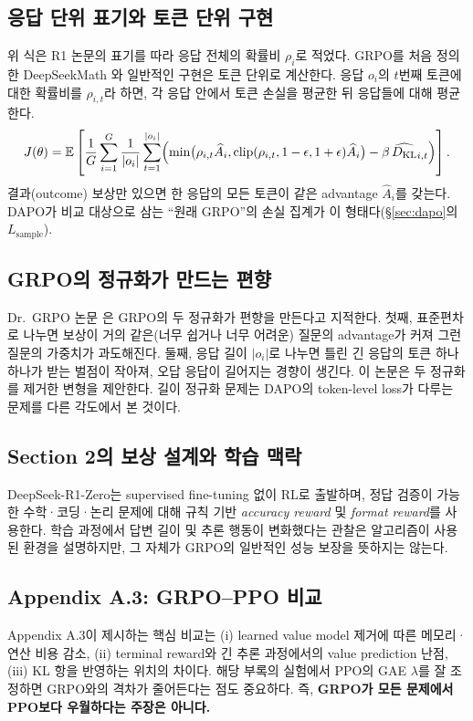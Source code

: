 \documentclass[11pt,a4paper]{article}
\newcommand{\E}{\mathbb{E}}
\newcommand{\KL}{D_{\mathrm{KL}}}
\newcommand{\clip}{\operatorname{clip}}
\begin{document}
\subsection{응답 단위 표기와 토큰 단위 구현}
위 식은 R1 논문의 표기를 따라 응답 전체의 확률비 \(\rho_i\)로 적었다. GRPO를 처음 정의한 DeepSeekMath \cite{deepseekmath}와 일반적인 구현은 토큰 단위로 계산한다. 응답 \(o_i\)의 \(t\)번째 토큰에 대한 확률비를 \(\rho_{i,t}\)라 하면, 각 응답 안에서 토큰 손실을 평균한 뒤 응답들에 대해 평균한다.
\begin{equation}
 J(\theta)=\E\left[\frac1G\sum_{i=1}^G\frac1{|o_i|}\sum_{t=1}^{|o_i|}\Bigl(\min\bigl(\rho_{i,t}\widehat A_i,\clip(\rho_{i,t},1-\epsilon,1+\epsilon)\widehat A_i\bigr)-\beta\,\widehat{\KL}_{i,t}\Bigr)\right].
\end{equation}
결과(outcome) 보상만 있으면 한 응답의 모든 토큰이 같은 advantage \(\widehat A_i\)를 갖는다. DAPO가 비교 대상으로 삼는 ``원래 GRPO''의 손실 집계가 이 형태다(\S\ref{sec:dapo}의 \(L_{\mathrm{sample}}\)).

\subsection{GRPO의 정규화가 만드는 편향}
Dr.~GRPO 논문 \cite{drgrpo}은 GRPO의 두 정규화가 편향을 만든다고 지적한다. 첫째, 표준편차로 나누면 보상이 거의 같은(너무 쉽거나 너무 어려운) 질문의 advantage가 커져 그런 질문의 가중치가 과도해진다. 둘째, 응답 길이 \(|o_i|\)로 나누면 틀린 긴 응답의 토큰 하나하나가 받는 벌점이 작아져, 오답 응답이 길어지는 경향이 생긴다. 이 논문은 두 정규화를 제거한 변형을 제안한다. 길이 정규화 문제는 DAPO의 token-level loss가 다루는 문제를 다른 각도에서 본 것이다.

\subsection{Section 2의 보상 설계와 학습 맥락}
DeepSeek-R1-Zero는 supervised fine-tuning 없이 RL로 출발하며, 정답 검증이 가능한 수학·코딩·논리 문제에 대해 규칙 기반 \emph{accuracy reward} 및 \emph{format reward}를 사용한다. 학습 과정에서 답변 길이 및 추론 행동이 변화했다는 관찰은 알고리즘이 사용된 환경을 설명하지만, 그 자체가 GRPO의 일반적인 성능 보장을 뜻하지는 않는다.

\subsection{Appendix A.3: GRPO--PPO 비교}
Appendix A.3이 제시하는 핵심 비교는 (i) learned value model 제거에 따른 메모리·연산 비용 감소, (ii) terminal reward와 긴 추론 과정에서의 value prediction 난점, (iii) KL 항을 반영하는 위치의 차이다. 해당 부록의 실험에서 PPO의 GAE \(\lambda\)를 잘 조정하면 GRPO와의 격차가 줄어든다는 점도 중요하다. 즉, \textbf{GRPO가 모든 문제에서 PPO보다 우월하다는 주장은 아니다.}
\end{document}
